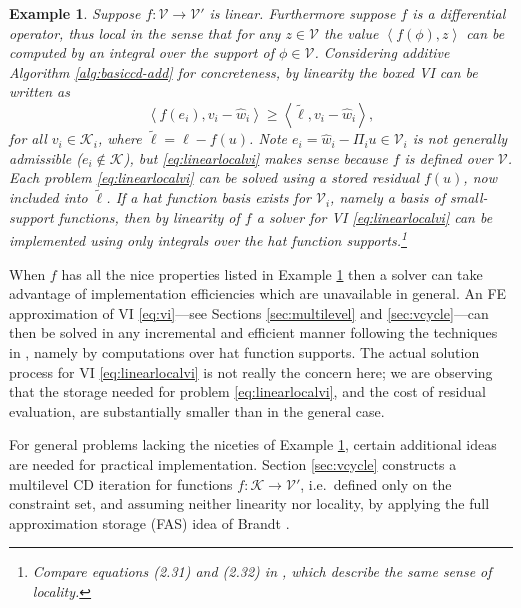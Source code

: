 \documentclass[letterpaper,final,12pt,reqno]{amsart}
\theoremstyle{cstyle}
\theoremstyle{cstyle*}
\theoremstyle{dstyle}
\newtheorem{example}[theorem]{Example}
\numberwithin{equation}{section}
\numberwithin{figure}{section}
\numberwithin{table}{section}
\numberwithin{theorem}{section}
\newcommand{\cK}{\mathcal{K}}
\newcommand{\cV}{\mathcal{V}}
\newcommand{\ip}[2]{\left<#1,#2\right>}
\begin{document}
\begin{example}  \label{ex:fnice} Suppose $f:\cV \to \cV'$ is linear.  Furthermore suppose $f$ is a differential operator, thus local in the sense that for any $z\in\mathcal{V}$ the value $\ip{f(\phi)}{z}$ can be computed by an integral over the support of $\phi \in \mathcal{V}$.  Considering additive Algorithm \ref{alg:basiccd-add} for concreteness, by linearity the boxed VI can be written as
\begin{equation}
\ip{f(e_i)}{v_i-\hat w_i} \ge \ip{\tilde\ell}{v_i-\hat w_i}, \label{eq:linearlocalvi}
\end{equation}
for all $v_i \in \mathcal{K}_i$, where $\tilde\ell = \ell - f(u)$.  Note $e_i = \hat w_i - \Pi_i u \in \cV_i$ is not generally admissible ($e_i \notin \cK$), but \eqref{eq:linearlocalvi} makes sense because $f$ is defined over $\cV$.  Each problem \eqref{eq:linearlocalvi} can be solved using a stored residual $f(u)$, now included into $\tilde\ell$.  If a hat function basis exists for $\cV_i$, namely a basis of small-support functions, then by linearity of $f$ a solver for VI \eqref{eq:linearlocalvi} can be implemented using only integrals over the hat function supports.\footnote{Compare equations (2.31) and (2.32) in \cite{Farrelletal2021}, which describe the same sense of locality.}
\end{example}

When $f$ has all the nice properties listed in Example \ref{ex:fnice} then a solver can take advantage of implementation efficiencies which are unavailable in general.  An FE approximation of VI \eqref{eq:vi}---see Sections \ref{sec:multilevel} and \ref{sec:vcycle}---can then be solved in any incremental and efficient manner following the techniques in \cite{GraeserKornhuber2009,Tai2003}, namely by computations over hat function supports.  The actual solution process for VI \eqref{eq:linearlocalvi} is not really the concern here; we are observing that the storage needed for problem \eqref{eq:linearlocalvi}, and the cost of residual evaluation, are substantially smaller than in the general case.

For general problems lacking the niceties of Example \ref{ex:fnice}, certain additional ideas are needed for practical implementation.  Section \ref{sec:vcycle} constructs a multilevel CD iteration for functions $f:\cK\to\cV'$, i.e.~defined only on the constraint set, and assuming neither linearity nor locality, by applying the full approximation storage (FAS) idea of Brandt \cite{Brandt1977}.
\end{document}
